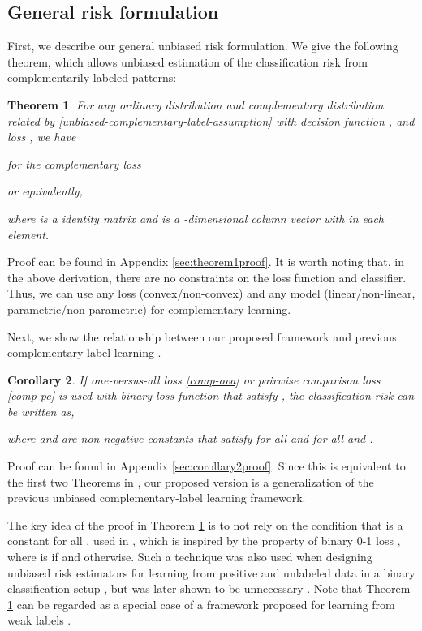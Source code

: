 \documentclass{article}
\newtheorem{theorem}{Theorem}
\newtheorem{corollary}[theorem]{Corollary}
\begin{document}
\subsection{General risk formulation}
\label{sc:general_risk_formulation}
First, we describe our general unbiased risk formulation.
We give the following theorem, which allows unbiased estimation of the classification risk from complementarily labeled patterns:
\begin{theorem}\label{theorem:R(f)}
For any ordinary distribution  and complementary distribution  related by \eqref{unbiased-complementary-label-assumption} with decision function , and loss , we have

for the complementary loss

or equivalently,

where
 is a  identity matrix and  is a -dimensional column vector with  in each element.
\end{theorem}
Proof can be found in Appendix \ref{sec:theorem1proof}.
It is worth noting that, in the above derivation,
there are no constraints on the loss
function and classifier.
Thus, we can use any loss (convex/non-convex) and any model (linear/non-linear, parametric/non-parametric) for complementary learning.

Next, we show the relationship between our proposed framework and previous complementary-label learning \citep{ishida17nips}.
\begin{corollary}\label{corollary}
If one-versus-all loss \eqref{comp-ova} or pairwise comparison loss \eqref{comp-pc} is used with binary loss function that satisfy , the classification risk can be written as,

where  and  are non-negative constants that satisfy  for all  and  for all  and .
\end{corollary}
Proof can be found in Appendix \ref{sec:corollary2proof}.  Since this is equivalent to the first two Theorems in \citet{ishida17nips}, our proposed version is a generalization of the previous unbiased complementary-label learning framework.

The key idea of the proof in Theorem \ref{theorem:R(f)} is to not rely on the condition
that  is a constant for all ,
used in \citet{ishida17nips}, which is inspired by the property of binary 0-1 loss ,
where  is  if  and  otherwise.
Such a technique was also used when designing unbiased risk estimators for learning from positive and unlabeled data in a binary classification setup \citep{christo14nips}, but was later shown to be unnecessary \citep{christo15icml}.
Note that Theorem \ref{theorem:R(f)} can be regarded as a special case of a framework proposed for learning from weak labels \citep{jesus14ecml}.
\end{document}
